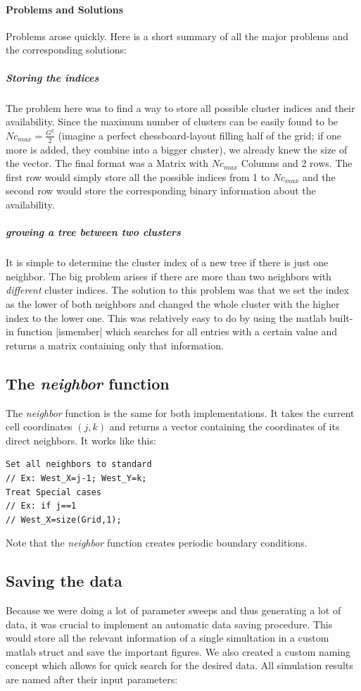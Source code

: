 \documentclass[11pt]{article}
\begin{document}
 \paragraph * {Problems and Solutions}
Problems arose quickly. Here is a short summary of all the major problems and the corresponding solutions:
\subparagraph {Storing the indices}
The problem here was to find a way to store all possible cluster indices and their availability. Since the maximum number of clusters can be easily found to be $Nc_{max}= \frac{G^2}{2}$  (imagine a perfect chessboard-layout filling half of the grid; if one more is added, they combine into a bigger cluster), we already knew the size of the vector. The final format was a Matrix with $Nc_{max}$ Columns and 2 rows. The first row would simply store all the possible indices from 1 to $Nc_{max}$ and the second row would store the corresponding binary information about the availability.
\subparagraph{growing a tree between two clusters}
It is simple to determine the cluster index of a new tree if there is just one neighbor. The big problem arises if there are more than two neighbors with \emph{different} cluster indices. The solution to this problem was that we set the index as the lower of both neighbors and changed the whole cluster with the higher index to the lower one. This was relatively easy to do by using the matlab built-in function |ismember| which searches for all entries with a certain value and returns a matrix containing only that information. 

\subsection{The \emph{neighbor} function}
The \emph{neighbor} function is the same for both implementations. It takes the current cell coordinates  $(j,k)$ and returns a vector containing the coordinates of its direct neighbors. It works like this:
\begin{verbatim}
Set all neighbors to standard
// Ex: West_X=j-1; West_Y=k;
Treat Special cases
// Ex: if j==1
// West_X=size(Grid,1);
\end{verbatim}
Note that the \emph{neighbor} function creates periodic boundary conditions. 

\subsection{Saving the data}
Because we were doing a lot of parameter sweeps and thus generating a lot of data, it was crucial to implement an automatic data saving procedure. This would store all the relevant information of a single simultation in a custom matlab struct and save the important figures. We also created a custom naming concept which allows for quick search for the desired data. All simulation results are named after their input parameters: 
\end{document}
